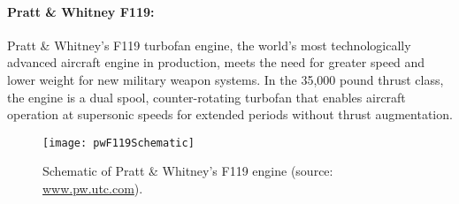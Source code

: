\paragraph{\label{SUBSEC_F119}Pratt \& Whitney F119:}
Pratt \& Whitney's F119 turbofan engine, the world's most technologically advanced aircraft engine in
production, meets the need for greater speed and lower weight for new military weapon systems. In the
35,000 pound thrust class, the engine is a dual spool, counter-rotating turbofan that enables aircraft
operation at supersonic speeds for extended periods without thrust augmentation.

\begin{figure}[!htb!]
 \centering
    {\texttt{[image: pwF119Schematic]}}
    \caption{\label{FIG_PW119}Schematic of Pratt \& Whitney's F119 engine (source: \url{www.pw.utc.com}).}
\end{figure}

